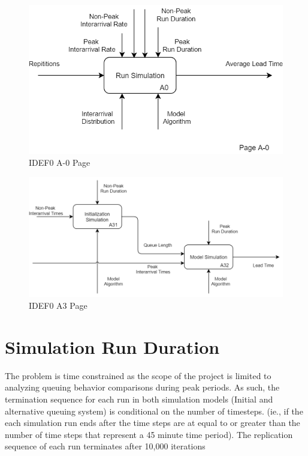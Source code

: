 \documentclass{article}
\begin{document}
\begin{figure}[h]
  \centering
  \includegraphics[scale=0.4]
  {A-0.png}
  
  \caption{IDEF0 A-0 Page}
  \label{IDEF02}
\end{figure}

\begin{figure}[h]
  \centering
  \includegraphics[scale=0.4]
  {A3.png}
  
  \caption{IDEF0 A3 Page}
  \label{IDEF03}
\end{figure}

\section{Simulation Run Duration}
The problem is time constrained as the scope of the project is limited to analyzing queuing behavior comparisons during peak periods. As such, the termination sequence for each run in both simulation models (Initial and alternative queuing system) is conditional on the number of timesteps. (ie., if the each simulation run ends after the time steps are at equal to or greater than the number of time steps that represent a 45 minute time period). The replication sequence of each run terminates after 10,000 iterations
\end{document}
